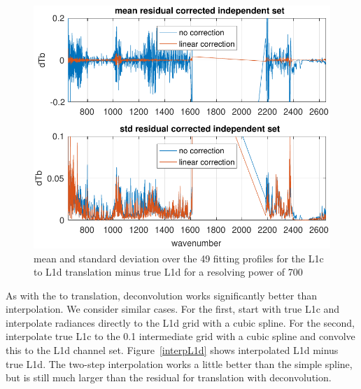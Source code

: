\documentclass[10pt,twocolumn]{article}  %
\begin{document}
\begin{figure} %
  \centering
  \includegraphics[width=\linewidth]{figures/L1d_cor1_700.pdf}
  \caption{mean and standard deviation over the 49 fitting profiles
    for the L1c to L1d translation minus true L1d for a resolving
    power of 700}
  \label{L1d700s}
\end{figure}

As with the {\airs} to {\cris} translation, deconvolution works
significantly better than interpolation.  We consider similar cases.
For the first, start with true L1c and interpolate radiances
directly to the L1d grid with a cubic spline.  For the second,
interpolate true L1c to the 0.1 {\wn} intermediate grid with a cubic
spline and convolve this to the L1d channel set.
Figure~\ref{interpL1d} shows interpolated L1d minus true L1d.  The
two-step interpolation works a little better than the simple spline,
but is still much larger than the residual for translation with
deconvolution.
\end{document}
